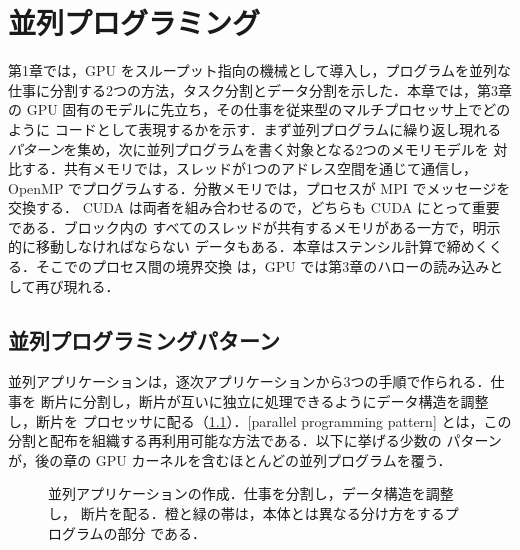 \documentclass[../main.tex]{subfiles}
\begin{document}
\chapter{並列プログラミング}

第1章では，GPU をスループット指向の機械として導入し，プログラムを並列な
仕事に分割する2つの方法，タスク分割とデータ分割を示した．本章では，第3章の
GPU 固有のモデルに先立ち，その仕事を従来型のマルチプロセッサ上でどのように
コードとして表現するかを示す．まず並列プログラムに繰り返し現れる
\emph{パターン}を集め，次に並列プログラムを書く対象となる2つのメモリモデルを
対比する．共有メモリでは，スレッドが1つのアドレス空間を通じて通信し，OpenMP
でプログラムする．分散メモリでは，プロセスが MPI でメッセージを交換する．
CUDA は両者を組み合わせるので，どちらも CUDA にとって重要である．ブロック内の
すべてのスレッドが共有するメモリがある一方で，明示的に移動しなければならない
データもある．本章はステンシル計算で締めくくる．そこでのプロセス間の境界交換
は，GPU では第3章のハローの読み込みとして再び現れる．

\section{並列プログラミングパターン}
\label{sec:l02-patterns}

並列アプリケーションは，逐次アプリケーションから3つの手順で作られる．仕事を
断片に分割し，断片が互いに独立に処理できるようにデータ構造を調整し，断片を
プロセッサに配る（\cref{fig:l02-parallel-app}）．[parallel programming pattern]
とは，この分割と配布を組織する再利用可能な方法である．以下に挙げる少数の
パターンが，後の章の GPU カーネルを含むほとんどの並列プログラムを覆う．

\begin{figure}[tb]
  \centering
  
  \caption{並列アプリケーションの作成．仕事を分割し，データ構造を調整し，
    断片を配る．橙と緑の帯は，本体とは異なる分け方をするプログラムの部分
    である．}
  \label{fig:l02-parallel-app}
\end{figure}
\end{document}
